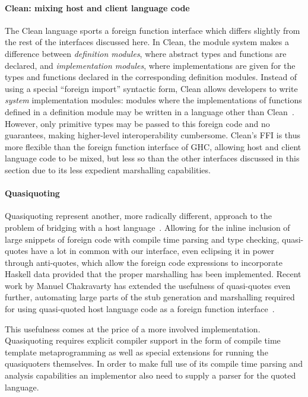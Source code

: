 \documentclass[preprint]{sigplanconf}
\begin{document}
\paragraph{Clean: mixing host and client language code}
The Clean language sports a foreign function interface which differs slightly
from the rest of the interfaces discussed here. In Clean, the module system
makes a difference between \emph{definition modules}, where abstract types and
functions are declared, and \emph{implementation modules}, where implementations
are given for the types and functions declared in the corresponding definition
modules.
Instead of using a special ``foreign import'' syntactic form, Clean allows
developers to write \emph{system} implementation modules: modules where the
implementations of functions defined in a definition module may be written in
a language other than Clean\ \cite{clean}. However, only primitive types may
be passed to this foreign code and no guarantees, making higher-level
interoperability cumbersome.
Clean's FFI is thus more flexible than the foreign function interface of GHC,
allowing host and client language code to be mixed, but less so than the other
interfaces discussed in this section due to its less expedient marshalling
capabilities.

\paragraph{Quasiquoting}
Quasiquoting represent another, more radically different, approach to the
problem of bridging with a host language\ \cite{quasiquotes}.
Allowing for the inline inclusion of large snippets of foreign code with
compile time parsing and type checking,
quasi-quotes have a lot in common with our interface, even eclipsing it in
power through anti-quotes, which allow the foreign code expressions to
incorporate Haskell data provided that the proper marshalling has been
implemented. Recent work by Manuel Chakravarty has extended the usefulness of
quasi-quotes even further, automating large parts of the stub generation
and marshalling required for using quasi-quoted host language code as a
foreign function interface\ \cite{language-c-inline}.

This usefulness comes at the price of a more involved implementation.
Quasiquoting requires explicit compiler support in the form of
compile time template metaprogramming as well as special extensions for running
the quasiquoters themselves.
In order to make full use of its compile time parsing and analysis capabilities
an implementor also need to supply a parser for the quoted language.
\end{document}
